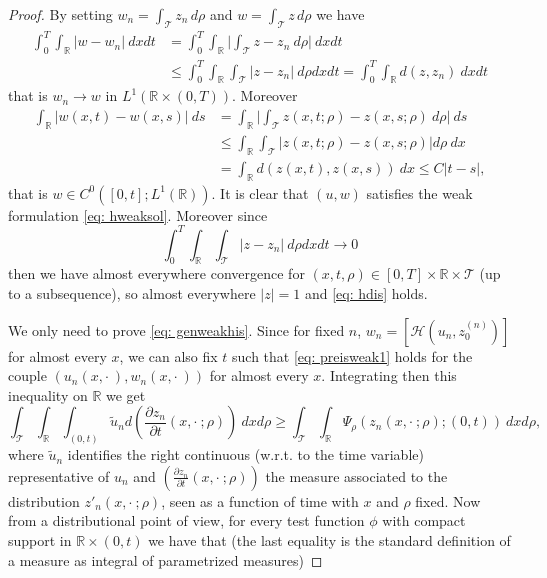 \documentclass[12pt]{article}
\newcommand{\R}{\mathbb{R}}
\newcommand{\HM}{\mathcal{H}}
\newcommand{\T}{\mathcal{T}}
\newcommand{\p}{\rho}
\newcommand{\1}{\mathds{1}}
\theoremstyle{definition}
\begin{document}
\begin{proof}
    By setting $w_n=\int_\T z_n \, d\p$ and $w=\int_\T z\, d\p$ we have \begin{equation}\begin{split}
        \int_0^T \int_\R |w-w_n| ~dxdt&= \int_0^T \int_\R \bigg|\int_\T z-z_n ~d\p \bigg| ~dxdt\\
        &\leq \int_0^T \int_\R 
        \int_\T |z-z_n|~d\p dxdt = \int_0^T \int_\R d(z,z_n)~dxdt
        \end{split}
    \end{equation} that is $w_n\to w$ in $L^1(\R \times (0,T))$. Moreover \begin{equation}
        \begin{split}
            \int_\R |w(x,t)-w(x,s)| ~ds &= \int_\R \bigg| \int_\T z(x,t;\p)-z(x,s;\p) ~d\p\bigg| ~ds\\ &\leq  \int_\R \int_\T |z(x,t;\p)-z(x,s;\p)| d\p~dx  \\ &= \int_\R d(z(x,t),z(x,s))~dx \leq C |t-s|,
        \end{split}
    \end{equation} that is $w\in C^0([0,t];L^1(\R))$.
    It is clear that $(u,w)$ satisfies the weak formulation \eqref{eq: hweaksol}. Moreover since \begin{equation}
        \int_0^T\int_{\mathbb{R}} \int_\T |z-z_n|~d\p dx dt\to 0
    \end{equation} then we have almost everywhere convergence for $(x,t,\p)\in[0,T]\times\mathbb{R}\times\T$ (up to a subsequence), so almost everywhere $|z|=1$ and \eqref{eq: hdis} holds.\par
    We only need to prove \eqref{eq: genweakhis}. Since for fixed $n$, $w_n = [\HM(u_n,z_0^{(n)})]$ for almost every $x$, we can also fix $t$ such that \eqref{eq: preisweak1} holds for the couple $(u_n(x,\cdot~),w_n(x,\cdot~))$ for almost every $x$. Integrating then this inequality on $\R$ we get \begin{equation}\label{eq: dis1}
        \int_{\T}\int_\R \int_{(0,t)} \tilde{u}_n d\left(\frac{\partial z_n}{\partial t} (x,\cdot~;\p)\right) ~dx d\p \geq \int_{\T}\int_\R \Psi_\p(z_n(x,\cdot~;\p);(0,t)) ~dxd\p ,
    \end{equation} where $\tilde{u}_n$ identifies the right continuous (w.r.t. to the time variable) representative of $u_n$ and $\left(\frac{\partial z_n}{\partial t} (x,\cdot~;\p)\right)$ the measure associated to the distribution $z'_n(x,\cdot~;\p)$, seen as a function of time with $x$ and $\p$ fixed. Now from a distributional point of view, for every test function $\phi$ with compact support in $\R\times (0,t)$ we have that (the last equality is the standard definition of a measure as integral of parametrized measures)

\end{proof}
\end{document}
